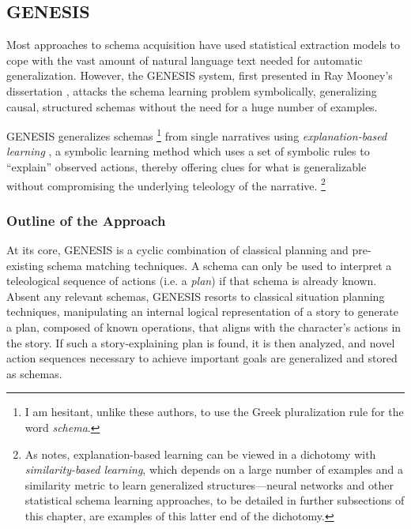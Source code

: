 
\subsection{GENESIS}
\label{sec:genesis}

Most approaches to schema acquisition have used statistical extraction models to cope with the vast amount of natural language text needed for automatic generalization. However, the GENESIS system, first presented in Ray Mooney's dissertation \citep{mooney:phd88}, attacks the schema learning problem symbolically, generalizing causal, structured schemas  without the need for a huge number of examples.

GENESIS generalizes schemas \footnote{I am hesitant, unlike these authors, to use the Greek pluralization rule for the word \textit{schema}.} from single narratives using \textit{explanation-based learning} \citep{mitchell1986}, a symbolic learning method which uses a set of symbolic rules to ``explain'' observed actions, thereby offering clues for what is generalizable without compromising the underlying teleology of the narrative. \footnote{As \citep{mooney90} notes, explanation-based learning can be viewed in a dichotomy with \textit{similarity-based learning}, which depends on a large number of examples and a similarity metric to learn generalized structures---neural networks and other statistical schema learning approaches, to be detailed in further subsections of this chapter, are examples of this latter end of the dichotomy.}

\subsubsection{Outline of the Approach}
\label{sec:genesisapproach}

At its core, GENESIS is a cyclic combination of classical planning and pre-existing schema matching techniques. A schema can only be used to interpret a teleological sequence of actions (i.e. a \textit{plan}) if that schema is already known. Absent any relevant schemas, GENESIS resorts to classical situation planning techniques, manipulating an internal logical representation of a story to generate a plan, composed of known operations, that aligns with the character's actions in the story. If such a story-explaining plan is found, it is then analyzed, and novel action sequences necessary to achieve important goals are generalized and stored as schemas.

